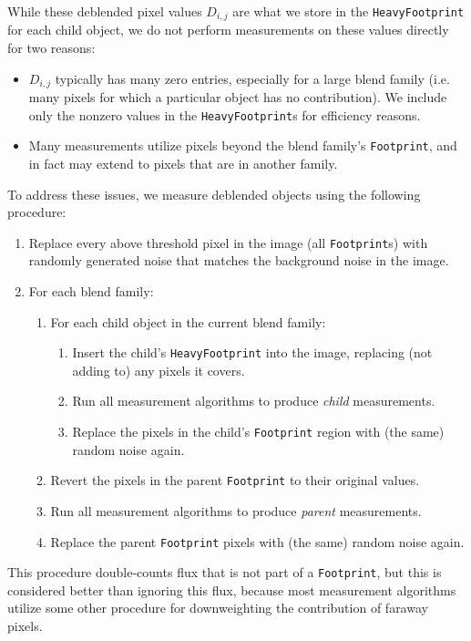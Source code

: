 \documentclass[10pt]{article}
\begin{document}
While these deblended pixel values $D_{i,j}$ are what we store in the
\texttt{HeavyFootprint} for each child object, we do not perform measurements
on these values directly for two reasons:
\begin{itemize}
\item $D_{i,j}$ typically has many zero entries, especially for a large blend
    family (i.e. many pixels for which a particular object has no
    contribution).  We include only the nonzero values in the
    \texttt{HeavyFootprint}s for efficiency reasons.
\item Many measurements utilize pixels beyond the blend family's
    \texttt{Footprint}, and in fact may extend to pixels that are in another
    family.
\end{itemize}
To address these issues, we measure deblended objects using the following
procedure:
\begin{enumerate}
\item Replace every above threshold pixel in the image (all
    \texttt{Footprint}s) with randomly generated noise that matches
    the background noise in the image.
\item For each blend family:
    \begin{enumerate}
    \item For each child object in the current blend family:
        \begin{enumerate}
        \item Insert the child's \texttt{HeavyFootprint} into the image,
            replacing (not adding to) any pixels it covers.
        \item Run all measurement algorithms to produce {\em child}
            measurements.
        \item Replace the pixels in the child's \texttt{Footprint} region
            with (the same) random noise again.
        \end{enumerate}
    \item Revert the pixels in the parent \texttt{Footprint} to their original
        values.
    \item Run all measurement algorithms to produce {\em parent} measurements.
    \item Replace the parent \texttt{Footprint} pixels with (the same) random
        noise again.
    \end{enumerate}
\end{enumerate}
This procedure double-counts flux that is not part of a \texttt{Footprint},
but this is considered better than ignoring this flux, because most
measurement algorithms utilize some other procedure for downweighting the
contribution of faraway pixels.
\end{document}
